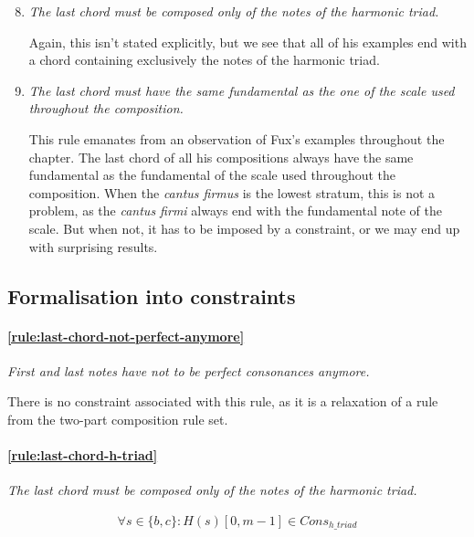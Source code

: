 \begin{enumerate}[wide, label=\bfseries G\arabic*]
    \setcounter{enumi}{7} %

    \item \textit{The last chord must be composed only of the notes of the harmonic triad.} \label{rule:last-chord-h-triad}

    Again, this isn't stated explicitly, but we see that all of his examples end with a chord containing exclusively the notes of the harmonic triad.
    
    \item \textit{The last chord must have the same fundamental as the one of the scale used throughout the composition.}\label{rule:same-fundamental}

    This rule emanates from an observation of Fux's examples throughout the chapter. The last chord of all his compositions always have the same fundamental as the fundamental of the scale used throughout the composition.
    When the \textit{cantus firmus} is the lowest stratum, this is not a problem, as the \textit{cantus firmi} always end with the fundamental note of the scale. But when not, it has to be imposed by a constraint, or we may end up with surprising results.
\end{enumerate}

\subsection{Formalisation into constraints} \label{sec:generalconstraints}
    \paragraph{\ref{rule:last-chord-not-perfect-anymore}} \textit{First and last notes have not to be perfect consonances anymore.}

    There is no constraint associated with this rule, as it is a relaxation of a rule from the two-part composition rule set.

    \paragraph{\ref{rule:last-chord-h-triad}} \textit{The last chord must be composed only of the notes of the harmonic triad.} 
    
    \begin{equation} \begin{aligned}
    \forall s \in \{b, c\} \colon H(s)[0, m-1] \in Cons_{h\_triad}
    \end{aligned} \end{equation}

